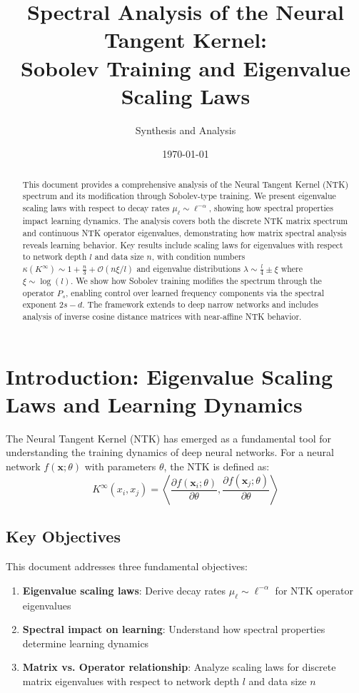 \documentclass{article}
\title{Spectral Analysis of the Neural Tangent Kernel:\\
Sobolev Training and Eigenvalue Scaling Laws}
\author{Synthesis and Analysis}
\date{\today}
\newcommand{\x}{\mathbf{x}}
\begin{document}
\maketitle

\begin{abstract}
This document provides a comprehensive analysis of the Neural Tangent Kernel (NTK) spectrum and its modification through Sobolev-type training. We present eigenvalue scaling laws with respect to decay rates $\mu_\ell \sim \ell^{-\alpha}$, showing how spectral properties impact learning dynamics. The analysis covers both the discrete NTK matrix spectrum and continuous NTK operator eigenvalues, demonstrating how matrix spectral analysis reveals learning behavior. Key results include scaling laws for eigenvalues with respect to network depth $l$ and data size $n$, with condition numbers $\kappa(K^{\infty}) \sim 1 + \frac{n}{3} + \mathcal{O}(n \xi / l)$ and eigenvalue distributions $\lambda \sim \frac{l}{4} \pm \xi$ where $\xi \sim \log(l)$. We show how Sobolev training modifies the spectrum through the operator $P_s$, enabling control over learned frequency components via the spectral exponent $2s-d$. The framework extends to deep narrow networks and includes analysis of inverse cosine distance matrices with near-affine NTK behavior.
\end{abstract}

\tableofcontents
\newpage

\section{Introduction: Eigenvalue Scaling Laws and Learning Dynamics}

The Neural Tangent Kernel (NTK) has emerged as a fundamental tool for understanding the training dynamics of deep neural networks. For a neural network $f(\x; \theta)$ with parameters $\theta$, the NTK is defined as:
$$K^{\infty}(x_i, x_j) = \left\langle \frac{\partial f(\x_i; \theta)}{\partial \theta}, \frac{\partial f(\x_j; \theta)}{\partial \theta} \right\rangle$$

\subsection{Key Objectives}

This document addresses three fundamental objectives:
\begin{enumerate}
\item \textbf{Eigenvalue scaling laws}: Derive decay rates $\mu_\ell \sim \ell^{-\alpha}$ for NTK operator eigenvalues
\item \textbf{Spectral impact on learning}: Understand how spectral properties determine learning dynamics  
\item \textbf{Matrix vs. Operator relationship}: Analyze scaling laws for discrete matrix eigenvalues with respect to network depth $l$ and data size $n$
\end{enumerate}
\end{document}
